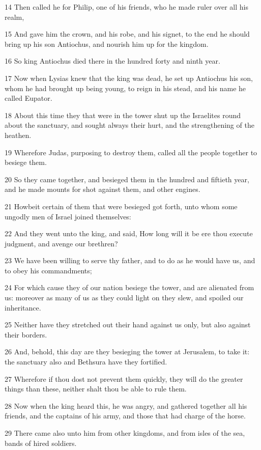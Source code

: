 \par 14 Then called he for Philip, one of his friends, who he made ruler over all his realm,
\par 15 And gave him the crown, and his robe, and his signet, to the end he should bring up his son Antiochus, and nourish him up for the kingdom.
\par 16 So king Antiochus died there in the hundred forty and ninth year.
\par 17 Now when Lysias knew that the king was dead, he set up Antiochus his son, whom he had brought up being young, to reign in his stead, and his name he called Eupator.
\par 18 About this time they that were in the tower shut up the Israelites round about the sanctuary, and sought always their hurt, and the strengthening of the heathen.
\par 19 Wherefore Judas, purposing to destroy them, called all the people together to besiege them.
\par 20 So they came together, and besieged them in the hundred and fiftieth year, and he made mounts for shot against them, and other engines.
\par 21 Howbeit certain of them that were besieged got forth, unto whom some ungodly men of Israel joined themselves:
\par 22 And they went unto the king, and said, How long will it be ere thou execute judgment, and avenge our brethren?
\par 23 We have been willing to serve thy father, and to do as he would have us, and to obey his commandments;
\par 24 For which cause they of our nation besiege the tower, and are alienated from us: moreover as many of us as they could light on they slew, and spoiled our inheritance.
\par 25 Neither have they stretched out their hand against us only, but also against their borders.
\par 26 And, behold, this day are they besieging the tower at Jerusalem, to take it: the sanctuary also and Bethsura have they fortified.
\par 27 Wherefore if thou dost not prevent them quickly, they will do the greater things than these, neither shalt thou be able to rule them.
\par 28 Now when the king heard this, he was angry, and gathered together all his friends, and the captains of his army, and those that had charge of the horse.
\par 29 There came also unto him from other kingdoms, and from isles of the sea, bands of hired soldiers.
